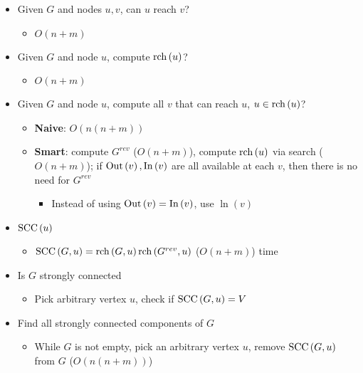   \begin{itemize}
    \item Given $ G $ and nodes $ u, v $, can $ u $ reach $ v $?
    \begin{itemize}
      \item $ O\left( n + m \right) $
    \end{itemize}
    \item Given $ G $ and node $ u $, compute $ \operatorname{rch}\left( u \right) $?
    \begin{itemize}
      \item $ O\left( n + m \right) $
    \end{itemize}

    \item Given $ G $ and node $ u $, compute all $ v $ that can reach $ u $,
    $ u \in \operatorname{rch}\left( u \right) $?
    \begin{itemize}
      \item \textbf{Naive}: $ O\left( n \left( n + m \right) \right) $
      \item \textbf{Smart}: compute $ G^{rev} $ ($ O\left( n + m \right) $),
      compute $ \operatorname{rch}\left( u \right) $ via search ($ O\left( n + m \right) $);
      if $ \operatorname{Out}\left( v \right), \operatorname{In}\left( v \right) $ are all available at
      each $ v $, then there is no need for $ G^{rev} $
      \begin{itemize}
        \item Instead of using $ \operatorname{Out}\left( v \right) = \operatorname{In}\left( v \right) $,
        use $ \ln\left( v \right) $
      \end{itemize}
    \end{itemize}

    \item $ \operatorname{SCC}\left( u \right) $
    \begin{itemize}
      \item $ \operatorname{SCC}\left( G, u \right) = \operatorname{rch}\left( G, u \right) \operatorname{rch} \left( G^{rev}, u \right) $
      ($ O\left( n + m \right) $) time
    \end{itemize}

    \item Is $ G $ strongly connected
    \begin{itemize}
      \item Pick arbitrary vertex $ u $, check if
      $ \operatorname{SCC}\left( G, u \right) = V $
    \end{itemize}

    \item Find all strongly connected components of $ G $
    \begin{itemize}
      \item While $ G $ is not empty, pick an arbitrary vertex $ u $,
      remove $ \operatorname{SCC}\left( G,u \right) $ from $ G $
      ($ O\left( n \left( n + m \right) \right) $)
    \end{itemize}
  \end{itemize}
